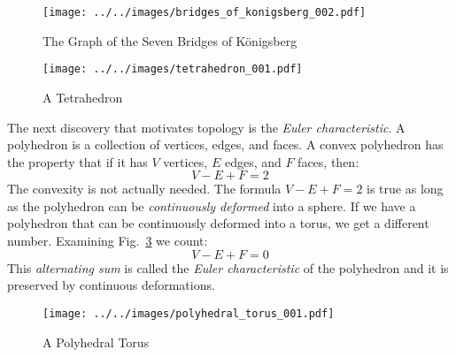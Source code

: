 \documentclass{article}
\theoremstyle{plain}
\theoremstyle{normal}
\begin{document}
        \begin{figure}
            \centering
            \texttt{[image: ../../images/bridges\_of\_konigsberg\_002.pdf]}
            \caption{The Graph of the Seven Bridges of K\"{o}nigsberg}
            \label{fig:bridges_of_konigsberg_002}
        \end{figure}
        \begin{figure}
            \centering
            \texttt{[image: ../../images/tetrahedron\_001.pdf]}
            \caption{A Tetrahedron}
            \label{fig:tetrahedron_001}
        \end{figure}
        \par\hfill\par
        The next discovery that motivates topology is the
        \textit{Euler characteristic}. A polyhedron is a collection of vertices,
        edges, and faces. A convex polyhedron has the property that if it has
        $V$ vertices, $E$ edges, and $F$ faces, then:
        \begin{equation}
            V-E+F=2
        \end{equation}
        The convexity is not actually needed. The formula $V-E+F=2$ is true as
        long as the polyhedron can be \textit{continuously deformed} into a
        sphere. If we have a polyhedron that can be continuously deformed into
        a torus, we get a different number. Examining
        Fig.~\ref{fig:polyhedral_torus_001} we count:
        \begin{equation}
            V-E+F=0
        \end{equation}
        This \textit{alternating sum} is called the
        \textit{Euler characteristic}
        of the polyhedron and it is preserved by continuous deformations.
        \begin{figure}
            \centering
            \texttt{[image: ../../images/polyhedral\_torus\_001.pdf]}
            \caption{A Polyhedral Torus}
            \label{fig:polyhedral_torus_001}
        \end{figure}
\end{document}
